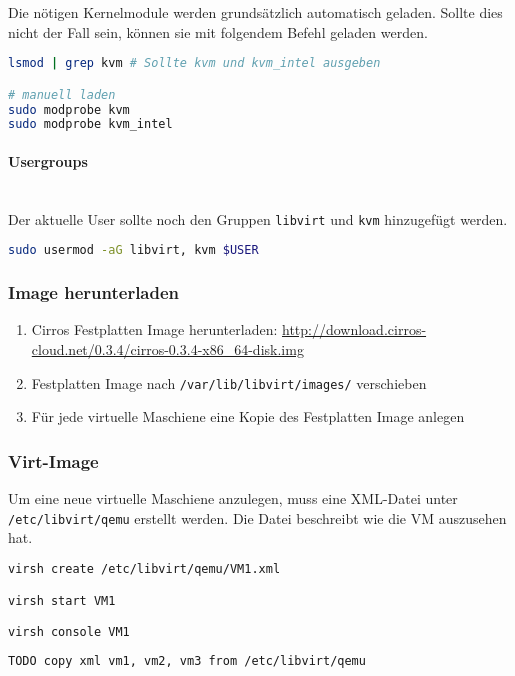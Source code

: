 Die nötigen Kernelmodule werden grundsätzlich automatisch geladen. Sollte dies nicht der Fall sein, können sie mit folgendem Befehl geladen werden.
\begin{lstlisting}[language=bash]
lsmod | grep kvm # Sollte kvm und kvm_intel ausgeben 

# manuell laden
sudo modprobe kvm
sudo modprobe kvm_intel
\end{lstlisting}

\paragraph{Usergroups} \hfill \\
Der aktuelle User sollte noch den Gruppen \lstinline|libvirt| und \lstinline|kvm| hinzugefügt werden.
\begin{lstlisting}[language=bash]
sudo usermod -aG libvirt, kvm $USER
\end{lstlisting}





\subsubsection{Image herunterladen}
\begin{enumerate}
	\item Cirros Festplatten Image herunterladen: \url{http://download.cirros-cloud.net/0.3.4/cirros-0.3.4-x86_64-disk.img}
	\item Festplatten Image nach \lstinline|/var/lib/libvirt/images/| verschieben
	\item Für jede virtuelle Maschiene eine Kopie des Festplatten Image anlegen
\end{enumerate}

\subsubsection{Virt-Image}
Um eine neue virtuelle Maschiene anzulegen, muss eine XML-Datei unter \lstinline|/etc/libvirt/qemu| erstellt werden. Die Datei beschreibt wie die VM auszusehen hat. 


\begin{lstlisting}[language=bash]
virsh create /etc/libvirt/qemu/VM1.xml

virsh start VM1 

virsh console VM1
\end{lstlisting}

\begin{lstlisting}[language=XML]
 TODO copy xml vm1, vm2, vm3 from /etc/libvirt/qemu
\end{lstlisting}

